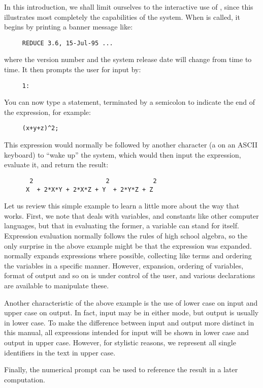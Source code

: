 In this introduction, we shall limit ourselves to the interactive use of
{\REDUCE}, since this illustrates most completely the capabilities of the
system. When {\REDUCE} is called, it begins by printing a banner message
like:
\begin{verbatim}
     REDUCE 3.6, 15-Jul-95 ...
\end{verbatim}
where the version number and the system release date will change from time
to time. It then prompts the user for input by:
\begin{verbatim}
     1:
\end{verbatim}
You can now type a {\REDUCE} statement, terminated by a semicolon to indicate
the end of the expression, for example:
\begin{verbatim}
     (x+y+z)^2;
\end{verbatim}
This expression would normally be followed by another character (a
 on an ASCII keyboard) to ``wake up'' the system, which would
then input the expression, evaluate it, and return the result:
\begin{verbatim}
       2                    2            2
      X  + 2*X*Y + 2*X*Z + Y  + 2*Y*Z + Z
\end{verbatim}
Let us review this simple example to learn a little more about the way that
{\REDUCE} works. First, we note that {\REDUCE} deals with variables, and
constants like other computer languages, but that in evaluating the former,
a variable can stand for itself. Expression evaluation normally follows
the rules of high school algebra, so the only surprise in the above example
might be that the expression was expanded. {\REDUCE} normally expands
expressions where possible, collecting like terms and ordering the
variables in a specific manner. However, expansion, ordering of variables,
format of output and so on is under control of the user, and various
declarations are available to manipulate these.

Another characteristic of the above example is the use of lower case on
input and upper case on output.  In fact, input may be in either mode, but
output is usually in lower case.  To make the difference between input and
output more distinct in this manual, all expressions intended for input
will be shown in lower case and output in upper case.  However, for
stylistic reasons, we represent all single identifiers in the text in
upper case.

Finally, the numerical prompt can be used to reference the result in a
later computation.

